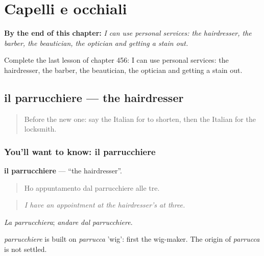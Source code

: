 
\chapter{Capelli e occhiali}
\label{ch:it-capelli-e-occhiali}

\begin{chapteropening}
\textbf{By the end of this chapter:} \emph{I can use personal services: the hairdresser, the barber, the beautician, the optician and getting a stain out.}

Complete the last lesson of chapter 456: I can use personal services: the hairdresser, the barber, the beautician, the optician and getting a stain out.
\end{chapteropening}

\section[il parrucchiere]{il parrucchiere — the hairdresser}

\label{lesson:IT-C456-parrucchiere}



\begin{quote}
Before the new one: say the Italian for to shorten, then the Italian for the locksmith.
\end{quote}

\subsection*{You'll want to know: il parrucchiere}
\textbf{il parrucchiere} — \textquotedblleft{}the hairdresser\textquotedblright{}.

\begin{quote}
Ho appuntamento dal parrucchiere alle tre.
\end{quote}

\begin{quote}
\emph{I have an appointment at the hairdresser's at three.}
\end{quote}

\emph{La parrucchiera}; \emph{andare dal parrucchiere}.

\begin{cousinweb}
\emph{parrucchiere} is built on \emph{parrucca} 'wig': first the wig-maker. The origin of \emph{parrucca} is not settled.
\end{cousinweb}

